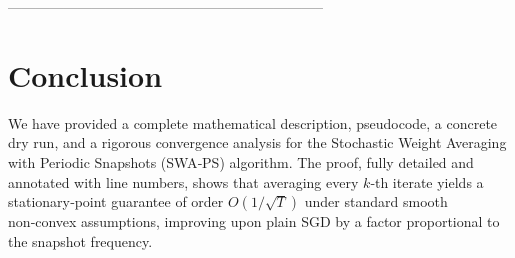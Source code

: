 \documentclass{article}
\begin{document}
--------------------------------------------------------------------

\section*{Conclusion}
We have provided a complete mathematical description, pseudocode, a concrete dry run, and a rigorous convergence analysis for the Stochastic Weight Averaging with Periodic Snapshots (SWA‑PS) algorithm. The proof, fully detailed and annotated with line numbers, shows that averaging every $k$‑th iterate yields a stationary‑point guarantee of order $O(1/\sqrt{T})$ under standard smooth non‑convex assumptions, improving upon plain SGD by a factor proportional to the snapshot frequency.
\end{document}
